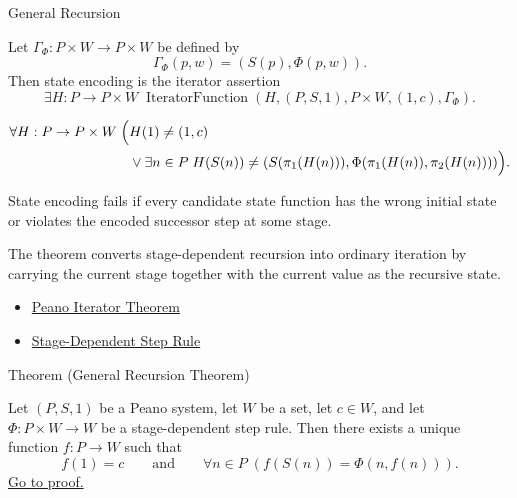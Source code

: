 \begin{topicbox}{General Recursion}
\begin{remark*}
Let $\Gamma_\Phi:P\times W\to P\times W$ be defined by
\[
\Gamma_\Phi(p,w)=(S(p),\Phi(p,w)).
\]
Then state encoding is the iterator assertion
\[
\exists H:P\to P\times W\;
\operatorname{IteratorFunction}(H,(P,S,1),P\times W,(1,c),\Gamma_\Phi).
\]
\end{remark*}

\begin{remark*}
\[
\begin{aligned}
\forall H:P\to P\times W\;\Bigl(&
H(1)\neq (1,c)\\
&\lor \exists n\in P\;
H(S(n))\neq(S(\pi_1(H(n))),\Phi(\pi_1(H(n)),\pi_2(H(n))))\Bigr).
\end{aligned}
\]
\end{remark*}

\begin{remark*}
State encoding fails if every candidate state function has the wrong initial
state or violates the encoded successor step at some stage.
\end{remark*}

\begin{remark*}[Interpretation]
The theorem converts stage-dependent recursion into ordinary iteration by
carrying the current stage together with the current value as the recursive
state.
\end{remark*}

\begin{dependencies}
\begin{itemize}
  \item \hyperref[thm:peano-iterator-theorem]{Peano Iterator Theorem}
  \item \hyperref[def:stage-dependent-step-rule]{Stage-Dependent Step Rule}
\end{itemize}
\end{dependencies}

\begin{theorembox}{Theorem (General Recursion Theorem)}
\begin{theorem}
\label{thm:general-recursion-theorem-for-peano-system}
Let $(P,S,1)$ be a Peano system, let $W$ be a set, let $c\in W$, and let
$\Phi:P\times W\to W$ be a stage-dependent step rule. Then there exists a
unique function $f:P\to W$ such that
\[
f(1)=c
\qquad\text{and}\qquad
\forall n\in P\;(f(S(n))=\Phi(n,f(n))).
\]
\hyperref[prf:general-recursion-theorem-for-peano-system]{Go to proof.}
\end{theorem}
\end{theorembox}


\end{topicbox}
